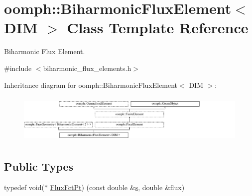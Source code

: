 \hypertarget{classoomph_1_1BiharmonicFluxElement}{}\section{oomph\+:\+:Biharmonic\+Flux\+Element$<$ D\+IM $>$ Class Template Reference}
\label{classoomph_1_1BiharmonicFluxElement}


Biharmonic Flux Element.  




{\ttfamily \#include $<$biharmonic\+\_\+flux\+\_\+elements.\+h$>$}

Inheritance diagram for oomph\+:\+:Biharmonic\+Flux\+Element$<$ D\+IM $>$\+:\begin{figure}[H]
\begin{center}
\leavevmode
\includegraphics[height=2.424242cm]{classoomph_1_1BiharmonicFluxElement}
\end{center}
\end{figure}
\subsection*{Public Types}
\begin{DoxyCompactItemize}
\item 
typedef void($\ast$ \hyperlink{classoomph_1_1BiharmonicFluxElement_a0fafeac48951b37cf5cd86aa486945a8}{Flux\+Fct\+Pt}) (const double \&\hyperlink{cfortran_8h_ab7123126e4885ef647dd9c6e3807a21c}{s}, double \&flux)
\end{DoxyCompactItemize}
